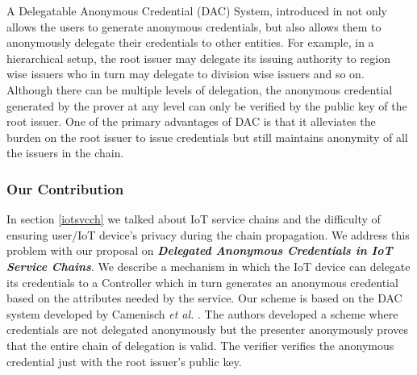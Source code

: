 \documentclass[journal]{IEEEtran}
\begin{document}
A Delegatable Anonymous Credential (DAC) System, introduced in \cite{delegatabledac} not only allows the users to generate anonymous credentials, but also allows them to anonymously delegate their credentials to other entities. For example, in a hierarchical setup, the root issuer may delegate its issuing authority to region wise issuers who in turn may delegate to division wise issuers and so on. Although there can be multiple levels of delegation, the anonymous credential generated by the prover at any level can only be verified by the public key of the root issuer.  One of the primary advantages of DAC is that it alleviates the burden on the root issuer to issue credentials but still maintains anonymity of all the issuers in the chain.

\subsubsection{Our Contribution}
In section \ref{iotsvcch} we talked about IoT service chains and the difficulty of ensuring user/IoT device's privacy during the chain propagation. We address this problem with our proposal on \textbf{\textit{Delegated Anonymous Credentials in IoT Service Chains}}. We describe a mechanism in which the IoT device can delegate its credentials to a Controller which in turn generates an anonymous credential based on the attributes needed by the service. Our scheme is based on the DAC system developed by Camenisch \textit{et al.} \cite{CamenischDD17}. The authors developed a scheme where credentials are not delegated anonymously but the presenter anonymously proves that the entire chain of delegation is valid. The verifier verifies the anonymous credential just with the root issuer's public key.
\end{document}
